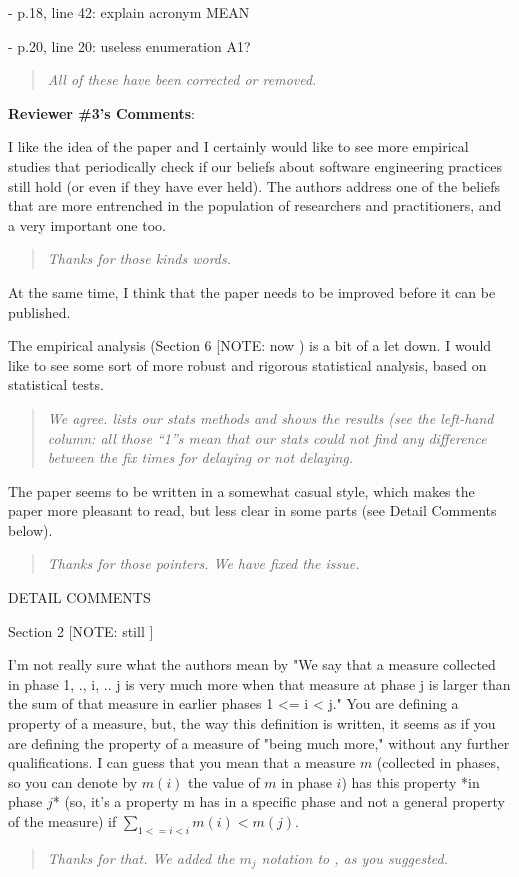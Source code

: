 - p.18, line 42: explain acronym MEAN 

- p.20, line 20: useless enumeration A1?

\begin{quote}{\em
 All of these have been corrected or removed.
 }\end{quote}
 

{\bf  Reviewer \#3's Comments}: 

I like the idea of the paper and I certainly
would like to see more empirical studies that periodically
check if our beliefs about software engineering practices
still hold (or even if they have ever held). The authors
address one of the beliefs that are more entrenched in the
population of researchers and practitioners, and a very
important one too.


\begin{quote}{\em
Thanks for those kinds words.
 }\end{quote}

At the same time, I think that the paper needs to be
improved before it can be published.

The empirical analysis (Section 6 [NOTE: now ) is a bit of a let down. I
would like to see some sort of more robust and rigorous
statistical analysis, based on statistical tests.



\begin{quote}{\em
We agree.  lists our stats methods and 
shows the results (see the left-hand column: all those ``1''s mean
that our stats could not find any difference between the fix times for
delaying or not delaying.
 }\end{quote}
 
 
The paper seems to be written in a somewhat casual style,
which makes the paper more pleasant to read, but less clear
in some parts (see Detail Comments below).

\begin{quote}{\em
Thanks for those pointers. We have fixed the issue.
 }\end{quote}

DETAIL COMMENTS

Section 2 [NOTE: still ]

I'm not really sure what the authors mean by "We say that a
measure collected in phase 1, ., i, .. j is very much more
when that measure at phase j is larger than the sum of that
measure in earlier phases 1 <= i < j." You are defining a
property of a measure, but, the way this definition is
written, it seems as if you are defining the property of a
measure of "being much more," without any further
qualifications.  I can guess that you mean that a measure
$m$ (collected in phases, so you can denote by $m(i)$ the
value of $m$ in phase $i$) has this property *in phase $j$*
(so, it's a property m has in a specific phase and not a
general property of the measure) if $\sum_{1 <= i < i} m(i)
< m(j)$. 
\begin{quote}{\em
Thanks for that. We added the $m_j$ notation to , as you suggested.
 }\end{quote}
 
